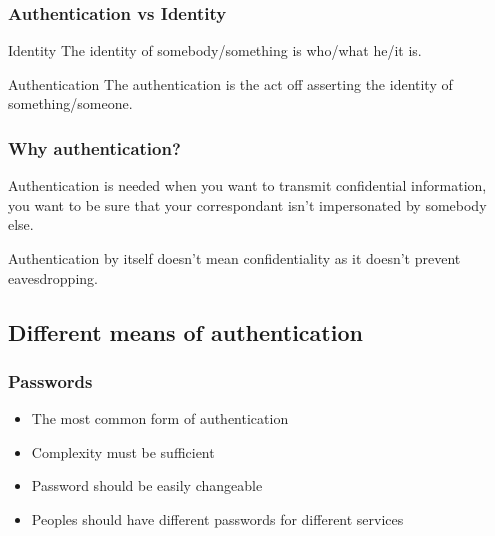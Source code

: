 \begin{frame}
\frametitle{Authentication vs Identity}
\begin{block}{Identity} 
The identity of somebody/something is who/what he/it is.
\end{block}
\begin{block}{Authentication} The authentication is the act off asserting the
identity of something/someone.
\end{block}
\end{frame}


\begin{frame}
\frametitle{Why authentication?}

Authentication is needed when you want to transmit confidential
information, you want to be sure that your correspondant isn't
impersonated by somebody else.

Authentication by itself doesn't mean confidentiality as it doesn't
prevent eavesdropping.

\end{frame}



\begin{frame}
\subsection{Different means of authentication}
\frametitle{Passwords}

\begin{itemize}
\item The most common form of authentication
\item Complexity must be sufficient
\item Password should be easily changeable
\item Peoples should have different passwords for different services
\end{itemize}

\end{frame}


